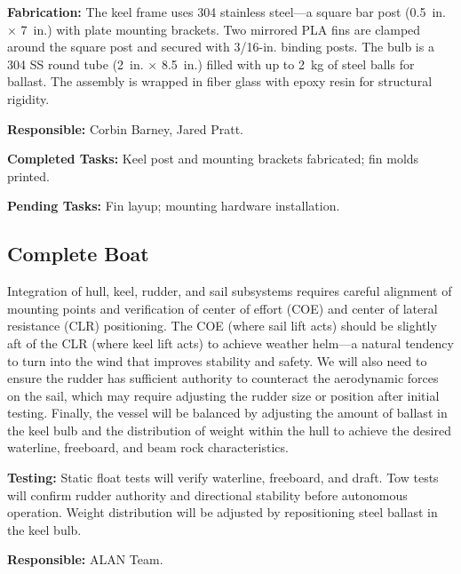 \textbf{Fabrication:} The keel frame uses 304 stainless steel---a square bar post (0.5~in. $\times$ 7~in.) with plate mounting brackets. Two mirrored PLA fins are clamped around the square post and secured with 3/16-in. binding posts. The bulb is a 304 SS round tube (2~in. $\times$ 8.5~in.) filled with up to 2~kg of steel balls for ballast. The assembly is wrapped in fiber glass with epoxy resin for structural rigidity.

\textbf{Responsible:} Corbin Barney, Jared Pratt.

\textbf{Completed Tasks:} Keel post and mounting brackets fabricated; fin molds printed.

\textbf{Pending Tasks:} Fin layup; mounting hardware installation.


\subsection{Complete Boat}

Integration of hull, keel, rudder, and sail subsystems requires careful alignment of mounting points and verification of center of effort (COE) and center of lateral resistance (CLR) positioning. The COE (where sail lift acts) should be slightly aft of the CLR (where keel lift acts) to achieve weather helm---a natural tendency to turn into the wind that improves stability and safety. We will also need to ensure the rudder has sufficient authority to counteract the aerodynamic forces on the sail, which may require adjusting the rudder size or position after initial testing. Finally, the vessel will be balanced by adjusting the amount of ballast in the keel bulb and the distribution of weight within the hull to achieve the desired waterline, freeboard, and beam rock characteristics.

\textbf{Testing:} Static float tests will verify waterline, freeboard, and draft. Tow tests will confirm rudder authority and directional stability before autonomous operation. Weight distribution will be adjusted by repositioning steel ballast in the keel bulb.

\textbf{Responsible:} ALAN Team.

